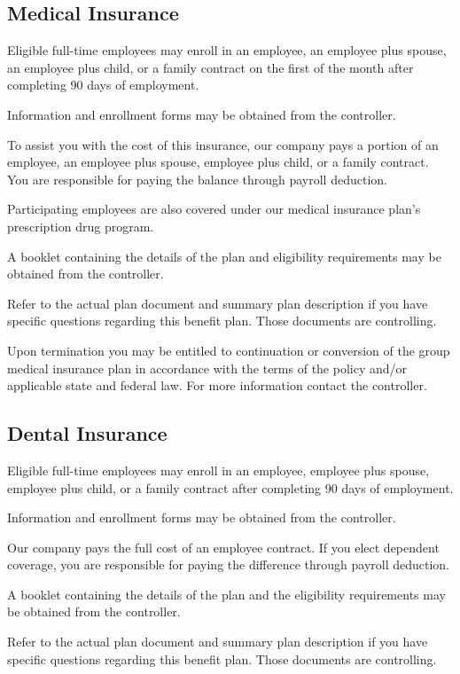 \documentclass{book}
\begin{document}
\subsection{Medical Insurance}

Eligible full-time employees may enroll in an employee, an employee plus spouse, an employee plus child, or a family contract on the first of the month after completing 90 days of employment.

Information and enrollment forms may be obtained from the controller.

To assist you with the cost of this insurance, our company pays a portion of an employee, an employee plus spouse, employee plus child, or a family contract. You are responsible for paying the balance through payroll deduction.

Participating employees are also covered under our medical insurance plan's prescription drug program.

A booklet containing the details of the plan and eligibility requirements may be obtained from the controller.

Refer to the actual plan document and summary plan description if you have specific questions regarding this benefit plan. Those documents are controlling.

Upon termination you may be entitled to continuation or conversion of the group medical insurance plan in accordance with the terms of the policy and/or applicable state and federal law. For more information contact the controller.

\subsection{Dental Insurance}

Eligible full-time employees may enroll in an employee, employee plus spouse, employee plus child, or a family contract after completing 90 days of employment.

Information and enrollment forms may be obtained from the controller.

Our company pays the full cost of an employee contract. If you elect dependent coverage, you are responsible for paying the difference through payroll deduction.

A booklet containing the details of the plan and the eligibility requirements may be obtained from the controller.

Refer to the actual plan document and summary plan description if you have specific questions regarding this benefit plan. Those documents are controlling.
\end{document}
